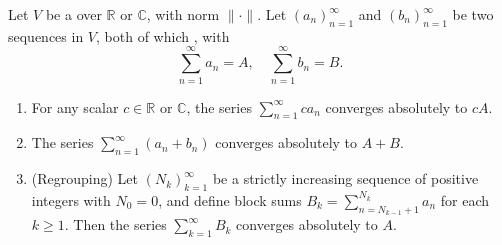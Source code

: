 \begin{proposition} \label{proposition:termwise_algebra_for_absolutely_convergent_series}
    Let $V$ be a  over $\mathbb{R}$ or $\mathbb{C}$, with norm $\|\cdot\|$. Let $(a_n)_{n=1}^\infty$ and $(b_n)_{n=1}^\infty$ be two sequences in $V$, both of which , with
    $$\sum_{n=1}^\infty a_n = A, \quad \sum_{n=1}^\infty b_n = B.$$

    \begin{enumerate}
        \item For any scalar $c \in \mathbb{R}$ or $\mathbb{C}$, the series $\sum_{n=1}^\infty c a_n$ converges absolutely to $cA$.
        \item The series $\sum_{n=1}^\infty (a_n + b_n)$ converges absolutely to $A + B$.
        \item (Regrouping) Let $(N_k)_{k=1}^\infty$ be a strictly increasing sequence of positive integers with $N_0 = 0$, and define block sums $B_k = \sum_{n=N_{k-1}+1}^{N_k} a_n$ for each $k \geq 1$. Then the series $\sum_{k=1}^\infty B_k$ converges absolutely to $A$.
    \end{enumerate}
\end{proposition}


